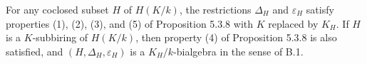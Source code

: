 For any coclosed subset $H$ of $H(K/k)$, the restrictions $\Delta_H$ and $\varepsilon_H$ satisfy properties (1), (2), (3), and (5) of Proposition 5.3.8 with $K$ replaced by $K_H$. If $H$ is a $K$-subbiring of $H(K/k)$, then property (4) of Proposition 5.3.8 is also satisfied, and $(H, \Delta_H, \varepsilon_H)$ is a $K_H/k$-bialgebra in the sense of B.1.

